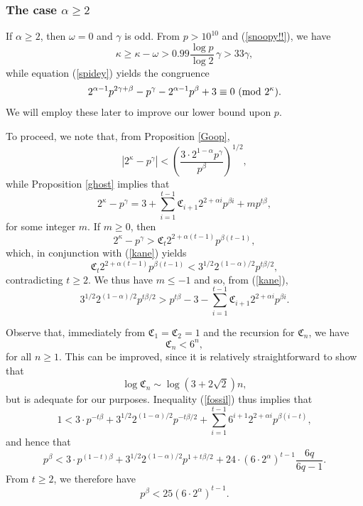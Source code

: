 \documentclass{amsart}
\def\mod#1{{\ifmmode\text{\rm\ (mod~$#1$)}
\else\discretionary{}{}{\hbox{ }}\rm(mod~$#1$)\fi}}
\begin{document}
{\subsubsection{The case $\alpha \geq 2$}

If $\alpha \geq 2$, then $\omega = 0$ and $\gamma$ is odd. From $p > 10^{10}$ and (\ref{snoopy!!}), we have 
\begin{equation} \label{magnet}
\kappa \geq \kappa-\omega > 0.99 \frac{\log p}{\log 2} \, \gamma > 33 \gamma,
\end{equation}
while equation (\ref{spidey}) yields the congruence
\begin{equation} \label{fridge}
2^{\alpha-1} p^{2\gamma+\beta} - p^\gamma - 2^{\alpha-1} p^\beta +3 \equiv 0 \mod{2^{\kappa}}.
\end{equation}
We will employ these later to improve our lower bound upon $p$.


To proceed, we note that, from Proposition \ref{Goop}, 
\begin{equation} \label{kane}
\left| 2^\kappa - p^\gamma \right| <  \left( \frac{3 \cdot 2^{1-\alpha} p^\gamma}{p^\beta} \right)^{1/2},
\end{equation}
while Proposition \ref{ghost} implies that
$$
2^\kappa - p^\gamma = 3 + \sum_{i=1}^{t-1} \mathfrak{C}_{i+1} 2^{2+\alpha i} p^{\beta i} +m p^{t \beta},
$$
for some integer $m$. If $m \geq 0$, then 
$$
2^\kappa - p^\gamma > \mathfrak{C}_{t} 2^{2+\alpha (t-1)} p^{\beta (t-1)},
$$
which, in conjunction with (\ref{kane}) yields
$$
\mathfrak{C}_{t} 2^{2+\alpha (t-1)} p^{\beta (t-1)} <
3^{1/2} 2^{(1-\alpha)/2} p^{t \beta/2},
$$
contradicting $t \geq 2$. We thus have $m \leq -1$ and so, from (\ref{kane}), 
\begin{equation} \label{fossil}
3^{1/2} 2^{(1-\alpha)/2} p^{t \beta/2} > p^{t\beta} -3-
\sum_{i=1}^{t-1} \mathfrak{C}_{i+1} 2^{2+\alpha i} p^{\beta i}.
\end{equation} 

Observe that, immediately from $\mathfrak{C}_1=\mathfrak{C}_2=1$ and the recursion for $\mathfrak{C}_n$, we have 
\begin{equation} \label{boop}
\mathfrak{C}_n < 6^n,
\end{equation}
for all $n \geq 1$. This can be improved, since it is relatively straightforward to show that 
$$
\log \mathfrak{C}_n \sim \log (3+2\sqrt{2}) n, 
$$
but is adequate for our purposes. Inequality (\ref{fossil}) thus implies that
\begin{equation} \label{trap}
1 < 3 \cdot p^{-t\beta} + 3^{1/2} 2^{(1-\alpha)/2} p^{-t \beta/2}
+\sum_{i=1}^{t-1} 6^{i+1} 2^{2+\alpha i} p^{\beta (i-t)},
\end{equation}
and hence that
$$
p^{\beta} < 3 \cdot p^{(1-t)\beta} + 3^{1/2} 2^{(1-\alpha)/2} p^{1+t \beta/2}
+24 \cdot \left( 6 \cdot 2^{\alpha} \right)^{t-1} 
\frac{6q}{6q-1}.
$$
From $t \geq 2$, we therefore have
\begin{equation} \label{trappy}
p^\beta < 25 \left( 6 \cdot 2^\alpha \right)^{t-1}.
\end{equation}

}
\end{document}
